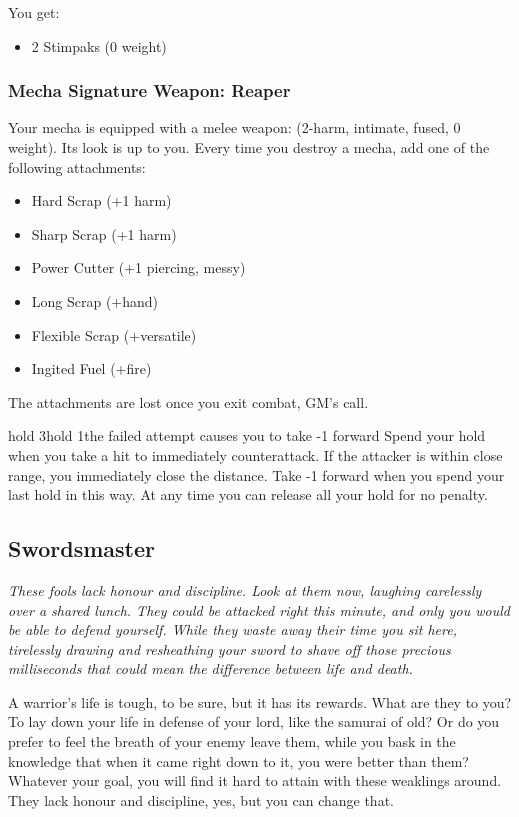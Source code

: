 You get:
\begin{itemize}
\item 2 Stimpaks (0 weight)
\end{itemize}

\subsubsection{Mecha Signature Weapon: Reaper}
Your mecha is equipped with a melee weapon: (2-harm, intimate, fused, 0 weight). Its look is up to you.
Every time you destroy a mecha, add one of the following attachments:
\begin{itemize}
\item Hard Scrap (+1 harm)
\item Sharp Scrap (+1 harm)
\item Power Cutter (+1 piercing, messy)
\item Long Scrap (+hand)
\item Flexible Scrap (+versatile)
\item Ingited Fuel (+fire)
\end{itemize}
The attachments are lost once you exit combat, GM's call.

{hold 3}{hold 1}{the failed attempt causes you to take -1 forward}
Spend your hold when you take a hit to immediately counterattack. If the attacker is within close range, you immediately close the distance. Take -1 forward when you spend your last hold in this way. At any time you can release all your hold for no penalty.



\subsection{Swordsmaster}
{\itshape These fools lack honour and discipline. Look at them now,
  laughing carelessly over a shared lunch. They could be attacked
  right this minute, and only you would be able to defend
  yourself. While they waste away their time you sit here, tirelessly
  drawing and resheathing your sword to shave off those precious
  milliseconds that could mean the difference between life and death.

A warrior's life is tough, to be sure, but it has its rewards. What
are they to you? To lay down your life in defense of your lord, like
the samurai of old? Or do you prefer to feel the breath of your enemy
leave them, while you bask in the knowledge that when it came right
down to it, you were better than them? Whatever your goal, you will
find it hard to attain with these weaklings around. They lack honour
and discipline, yes, but you can change that.}

